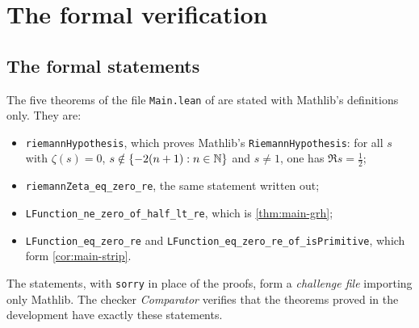 \section{The formal verification}\label{sec:verification}

\subsection{The formal statements}
The five theorems of the file \texttt{Main.lean} of \cite{LeanSource2026} are stated with Mathlib's
definitions only. They are:
\begin{itemize}
\item \texttt{riemannHypothesis}, which proves Mathlib's \texttt{RiemannHypothesis}: for all $s$ with
$\zeta(s)=0$, $s\notin\{-2(n+1):n\in\mathbb{N}\}$ and $s\ne1$, one has $\Re s=\frac12$;
\item \texttt{riemannZeta\_eq\_zero\_re}, the same statement written out;
\item \texttt{LFunction\_ne\_zero\_of\_half\_lt\_re}, which is \cref{thm:main-grh};
\item \texttt{LFunction\_eq\_zero\_re} and \texttt{LFunction\_eq\_zero\_re\_of\_isPrimitive}, which form
\cref{cor:main-strip}.
\end{itemize}
The statements, with \texttt{sorry} in place of the proofs, form a \emph{challenge file} importing only
Mathlib. The checker \emph{Comparator} verifies that the theorems proved in the development have
exactly these statements.

